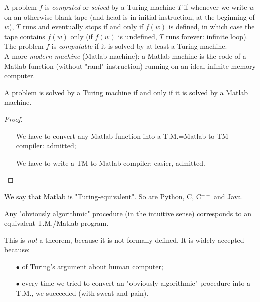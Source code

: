 A problem $f$ is \emph{computed} or \emph{solved} by a Turing machine $T$ if whenever we write $w$ on an otherwise blank tape (and head is in initial instruction, at the beginning of $w$), $T$ runs and eventually stops if and only if $f(w)$ is defined, in which case the tape contains $f(w)$ only (if $f(w)$ is undefined, $T$ runs forever: infinite loop).\\

The problem $f$ is \emph{computable} if it is solved by at least a Turing machine.\\

A more \emph{modern machine} (Matlab machine): a Matlab machine is the code of a Matlab function (without "rand" instruction) running on an ideal infinite-memory computer.\\

\begin{theorem}
A problem is solved by a Turing machine if and only if it is solved by a Matlab machine.
\end{theorem}
\begin{proof}
\hfill
\begin{itemize}
\item[{\color{cyan}\fbox{$\Leftarrow$}}]  We have to convert any Matlab function into a T.M.=Matlab-to-TM compiler: admitted;
\item[{\color{cyan}\fbox{$\Rightarrow$}}] We have to write a TM-to-Matlab compiler: easier, admitted.
\end{itemize}
\end{proof}

We say that Matlab is "Turing-equivalent". So are Python, C, C$^{++}$ and Java.\\

\begin{thesis}
Any "obviously algorithmic" procedure (in the intuitive sense) corresponds to an equivalent T.M./Matlab program.
\end{thesis}
This is \emph{not} a theorem, because it is not formally defined. It is widely accepted because: 
\begin{itemize}
\item[$\bullet$] of Turing's argument about human computer;
\item[$\bullet$] every time we tried to convert an "obviously algorithmic" procedure into a T.M., we succeeded (with sweat and pain).\\
\end{itemize} 

